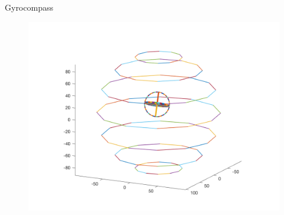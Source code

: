\documentclass[10pt]{beamer}
\begin{document}
\begin{frame}{Gyrocompass}
    \begin{figure}
		\centering
		\includegraphics[width=\textwidth]{demo_pointing_north.png}
	\end{figure}
\end{frame}
\end{document}
